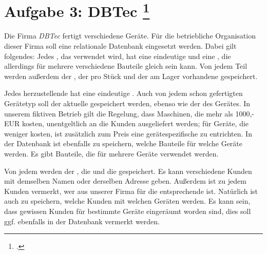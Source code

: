 \documentclass{lehramt-informatik-aufgabe}
\begin{document}

\section{Aufgabe 3: DBTec
\footcite{db:ab:1}}

Die Firma \emph{DBTec} fertigt verschiedene Geräte. Für die betriebliche
Organisation dieser Firma soll eine relationale Datenbank eingesetzt
werden. Dabei gilt folgendes:
Jedes , das verwendet wird, hat eine eindeutige
 und eine , die allerdings
für mehrere verschiedene Bauteile gleich sein kann. Von jedem Teil
werden außerdem der , der
 pro Stück und der am Lager vorhandene
 gespeichert.

Jedes herzustellende  hat eine eindeutige
. Auch von jedem schon gefertigten Gerätetyp
soll der aktuelle  gespeichert werden, ebenso
wie der  des Gerätes. In unserem fiktiven
Betrieb gilt die Regelung, dass Maschinen, die mehr als 1000,- EUR
kosten, unentgeltlich an die Kunden ausgeliefert werden; für Geräte, die
weniger kosten, ist zusätzlich zum Preis eine gerätespezifische
 zu entrichten. In der Datenbank ist
ebenfalls zu speichern, welche Bauteile für welche Geräte
 werden. Es gibt Bauteile, die für mehrere
Geräte verwendet werden.

Von jedem  werden der , die
 und die  gespeichert. Es kann
verschiedene Kunden mit demselben Namen oder derselben Adresse geben.
Außerdem ist zu jedem Kunden vermerkt, wer aus unserer Firma für die
entsprechende  ist.
Natürlich ist auch zu speichern, welche Kunden mit welchen Geräten
 werden. Es kann sein, dass gewissen Kunden
für bestimmte Geräte  eingeräumt worden
sind, dies soll ggf. ebenfalls in der Datenbank vermerkt werden.
\end{document}

